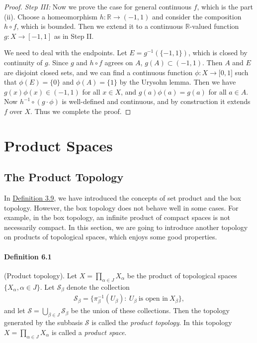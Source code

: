 \documentclass{article}
\numberwithin{equation}{section}
\theoremstyle{plain}
\theoremstyle{definition}
\begin{document}
\begin{proof}
\textit{Step III:} Now we prove the case for general continuous $f$, which is the part (ii). Choose a homeomorphism $h:\mathbb{R}\to(-1,1)$ and consider the composition $h\circ f$, which is bounded. Then we extend it to a continuous $\mathbb{R}$-valued function $g:X\to[-1,1]$ as in Step II. 

We need to deal with the endpoints. Let $E=g^{-1}(\{-1,1\})$, which is closed by continuity of $g$. Since $g$ and $h\circ f$ agrees on $A$, $g(A)\subset(-1,1)$. Then $A$ and $E$ are disjoint closed sets, and we can find a continuous function $\phi:X\to\mathbb[0,1]$ such that $\phi(E)=\{0\}$ and $\phi(A)=\{1\}$ by the Urysohn lemma. Then we have $g(x)\phi(x)\in(-1,1)$ for all $x\in X$, and $g(a)\phi(a)=g(a)$ for all $a\in A$. Now $h^{-1}\circ(g\cdot\phi)$ is well-defined and continuous, and by construction it extends $f$ over $X$. Thus we complete the proof.
\end{proof}

\newpage
\section{Product Spaces}
\subsection{The Product Topology}
In \hyperref[def:3.9]{Definition 3.9}, we have introduced the concepts of set product and the box topology. However, the box topology does not behave well in some cases. For example, in the box topology, an infinite product of compact spaces is not necessarily compact. In this section, we are going to introduce another topology on products of topological spaces, which enjoys some good properties.

\paragraph{Definition 6.1\label{def:6.1}} (Product topology). Let $X=\prod_{\alpha\in J}X_\alpha$ be the product of topological spaces $\{X_\alpha,\alpha\in J\}$. Let $\mathscr{S}_\beta$ denote the collection
\begin{align*}
	\mathscr{S}_\beta=\{\pi_\beta^{-1}(U_\beta):\ U_\beta\ \text{is open in}\ X_\beta\},
\end{align*}
and let $\mathscr{S}=\bigcup_{\beta\in J}\mathscr{S}_\beta$ be the union of these collections. Then the topology generated by the subbasis $\mathscr{S}$ is called the \textit{product topology}. In this topology $X=\prod_{\alpha\in J}X_\alpha$ is called a \textit{product space}.
\end{document}
